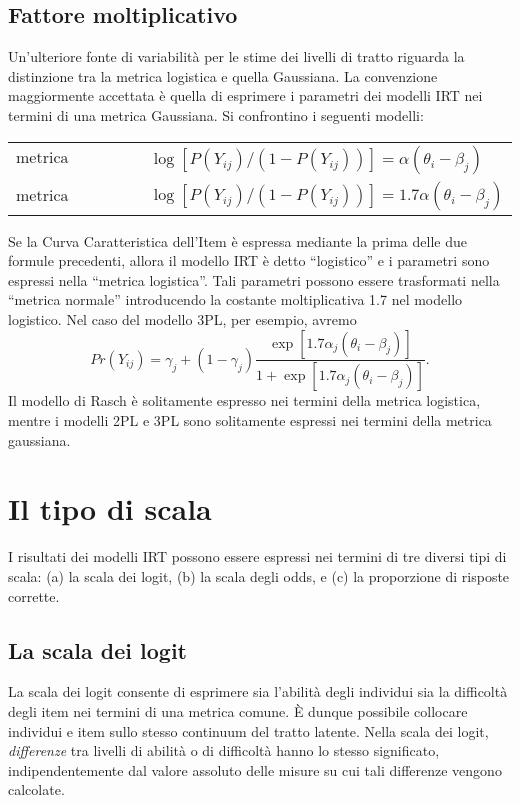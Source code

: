 \subsection{Fattore moltiplicativo}

Un'ulteriore fonte di variabilità per le stime dei livelli di tratto riguarda la distinzione tra la metrica logistica e quella Gaussiana.  La convenzione maggiormente accettata è quella di esprimere i parametri dei modelli IRT nei termini di una metrica Gaussiana.  Si confrontino i seguenti modelli:

\begin{tabular}{ll}
$\text{metrica logistica:}$ & $\log[P(Y_{ij})/(1-P(Y_{ij}))]= \alpha(\theta_i-\beta_j)$\\
$\text{metrica Gaussiana:}$ & $\log[P(Y_{ij})/(1-P(Y_{ij}))]= 1.7\alpha(\theta_i-\beta_j)$\\
\end{tabular}

Se la Curva Caratteristica dell'Item è espressa mediante la prima delle due formule precedenti, allora il modello IRT è detto ``logistico'' e i parametri sono espressi nella ``metrica logistica''.  Tali parametri possono essere trasformati nella ``metrica normale'' introducendo la costante moltiplicativa 1.7 nel modello logistico. Nel caso del modello 3PL, per esempio, avremo
\begin{equation} 
Pr(Y_{ij}) = \gamma_j + (1-\gamma_j) \frac{\exp[1.7\alpha_j(\theta_i-\beta_j)]}{1+\exp[1.7\alpha_j(\theta_i-\beta_j)]}.
\end{equation}
Il modello di Rasch è solitamente espresso nei termini della metrica logistica, mentre i modelli 2PL e 3PL sono solitamente espressi nei termini della metrica gaussiana.


\section{Il tipo di scala}

I risultati dei modelli IRT possono essere espressi nei termini di tre diversi tipi di scala: (a) la scala dei logit, (b) la scala degli odds, e (c) la proporzione di risposte corrette. 

\subsection{La scala dei logit}

La scala dei logit consente di esprimere sia l'abilità degli individui sia la difficoltà degli item nei termini di una metrica comune.  È dunque possibile collocare individui e item sullo stesso continuum del tratto latente. Nella scala dei logit, \emph{differenze} tra livelli di abilità o di difficoltà hanno lo stesso significato, indipendentemente dal valore assoluto delle misure su cui tali differenze vengono calcolate. 

